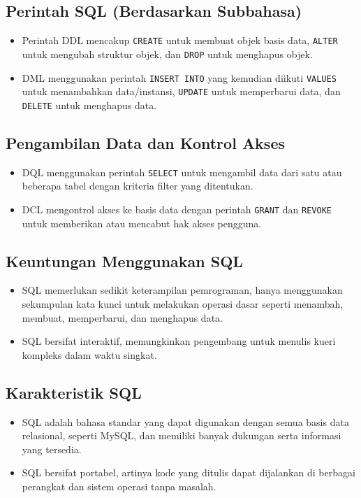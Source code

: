 \documentclass{article}
\begin{document}
\subsection{Perintah SQL (Berdasarkan Subbahasa)}
\begin{itemize}
    \item Perintah DDL mencakup \texttt{CREATE} untuk membuat objek basis data, \texttt{ALTER} untuk mengubah struktur objek, dan \texttt{DROP} untuk menghapus objek.
    \item DML menggunakan perintah \texttt{INSERT INTO} yang kemudian diikuti \texttt{VALUES} untuk menambahkan data/instansi, \texttt{UPDATE} untuk memperbarui data, dan \texttt{DELETE} untuk menghapus data.
\end{itemize}

\subsection{Pengambilan Data dan Kontrol Akses}
\begin{itemize}
    \item DQL menggunakan perintah \texttt{SELECT} untuk mengambil data dari satu atau beberapa tabel dengan kriteria filter yang ditentukan.
    \item DCL mengontrol akses ke basis data dengan perintah \texttt{GRANT} dan \texttt{REVOKE} untuk memberikan atau mencabut hak akses pengguna.
\end{itemize}

\subsection{Keuntungan Menggunakan SQL}
\begin{itemize}
    \item SQL memerlukan sedikit keterampilan pemrograman, hanya menggunakan sekumpulan kata kunci untuk melakukan operasi dasar seperti menambah, membuat, memperbarui, dan menghapus data.
    \item SQL bersifat interaktif, memungkinkan pengembang untuk menulis kueri kompleks dalam waktu singkat.
\end{itemize}

\subsection{Karakteristik SQL}
\begin{itemize}
    \item SQL adalah bahasa standar yang dapat digunakan dengan semua basis data relasional, seperti MySQL, dan memiliki banyak dukungan serta informasi yang tersedia.
    \item SQL bersifat portabel, artinya kode yang ditulis dapat dijalankan di berbagai perangkat dan sistem operasi tanpa masalah.
\end{itemize}
\end{document}
